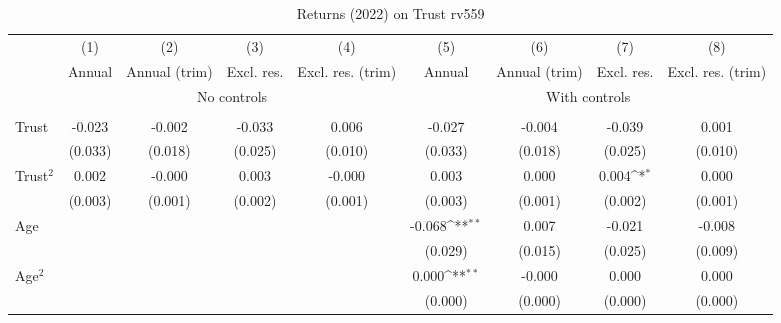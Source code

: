 \begin{table}[htbp]\centering
\def\sym#1{\ifmmode^{#1}\else\(^{#1}\)\fi}
\caption{Returns (2022) on Trust rv559}
\begin{tabular}{l*{8}{c}}
\toprule
          &\multicolumn{1}{c}{(1)}&\multicolumn{1}{c}{(2)}&\multicolumn{1}{c}{(3)}&\multicolumn{1}{c}{(4)}&\multicolumn{1}{c}{(5)}&\multicolumn{1}{c}{(6)}&\multicolumn{1}{c}{(7)}&\multicolumn{1}{c}{(8)}\\
          &\multicolumn{1}{c}{Annual}&\multicolumn{1}{c}{Annual (trim)}&\multicolumn{1}{c}{Excl. res.}&\multicolumn{1}{c}{Excl. res. (trim)}&\multicolumn{1}{c}{Annual}&\multicolumn{1}{c}{Annual (trim)}&\multicolumn{1}{c}{Excl. res.}&\multicolumn{1}{c}{Excl. res. (trim)}\\
& \multicolumn{4}{c}{No controls} & \multicolumn{4}{c}{With controls} \\\\ \cmidrule(lr){2-5}\cmidrule(lr){6-9}
Trust     &   -0.023         &   -0.002         &   -0.033         &    0.006         &   -0.027         &   -0.004         &   -0.039         &    0.001         \\
          &  (0.033)         &  (0.018)         &  (0.025)         &  (0.010)         &  (0.033)         &  (0.018)         &  (0.025)         &  (0.010)         \\
Trust$^{2}$&    0.002         &   -0.000         &    0.003         &   -0.000         &    0.003         &    0.000         &    0.004\sym{*}  &    0.000         \\
          &  (0.003)         &  (0.001)         &  (0.002)         &  (0.001)         &  (0.003)         &  (0.001)         &  (0.002)         &  (0.001)         \\
Age       &                  &                  &                  &                  &   -0.068\sym{**} &    0.007         &   -0.021         &   -0.008         \\
          &                  &                  &                  &                  &  (0.029)         &  (0.015)         &  (0.025)         &  (0.009)         \\
Age$^{2}$ &                  &                  &                  &                  &    0.000\sym{**} &   -0.000         &    0.000         &    0.000         \\
          &                  &                  &                  &                  &  (0.000)         &  (0.000)         &  (0.000)         &  (0.000)         \\

\end{tabular}
\end{table}
